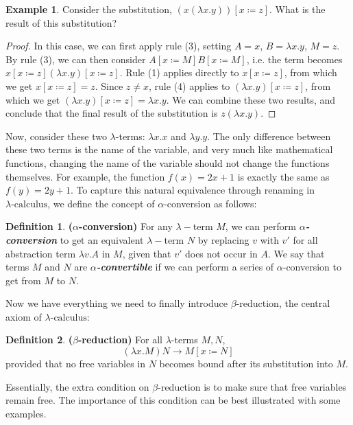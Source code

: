 \documentclass[a4paper,11pt]{article}
\theoremstyle{definition}
\newtheorem{definition}{Definition}[section]
\theoremstyle{example}
\newtheorem*{example}{Example}
\theoremstyle{lemma}
\newcommand{\lcalc}{\lambda\text{-calculus}}
\newcommand{\lamterm}[2]{\lambda #1. #2}
\newcommand{\subs}[3]{#1[#2\coloneqq#3]}
\newcommand{\redto}{\longrightarrow}
\begin{document}
\begin{example}
Consider the substitution, $\subs{(x(\lamterm{x}{y}))}{x}{z}$. What is the result of this substitution?
\end{example}
\begin{proof}
In this case, we can first apply rule (3), setting $A = x$, $B = \lamterm{x}{y}$, $M = z$. By rule (3), we can then consider $\subs{A}{x}{M}\subs{B}{x}{M}$, i.e. the term becomes $\subs{x}{x}{z}\subs{(\lamterm{x}{y})}{x}{z}$. Rule (1) applies directly to $\subs{x}{x}{z}$, from which we get $\subs{x}{x}{z} = z$. Since $z \neq x$, rule (4) applies to $\subs{(\lamterm{x}{y})}{x}{z}$, from which we get $\subs{(\lamterm{x}{y})}{x}{z} = \lamterm{x}{y}$. We can combine these two results, and conclude that the final result of the substitution is $z(\lamterm{x}{y})$.
\end{proof}

Now, consider these two $\lambda$-terms: $\lamterm{x}{x}$ and $\lamterm{y}{y}$. The only difference between these two terms is the name of the variable, and very much like mathematical functions, changing the name of the variable should not change the functions themselves. For example, the function $f(x) = 2x + 1$ is exactly the same as $f(y) = 2y + 1$. To capture this natural equivalence through renaming in $\lcalc$, we define the concept of $\alpha$-conversion as follows:

\begin{definition}
\textbf{($\alpha$-conversion)} For any $\lambda-$term $M$, we can perform \textit{\textbf{$\alpha$-conversion}} to get an equivalent $\lambda-$term $N$ by replacing $v$ with $v'$ for all abstraction term $\lamterm{v}{A}$ in $M$, given that $v'$ does not occur in $A$. We say that terms $M$ and $N$ are \textit{\textbf{$\alpha$-convertible}} if we can perform a series of $\alpha$-conversion to get from $M$ to $N$. 
\end{definition}

Now we have everything we need to finally introduce $\beta$-reduction, the central axiom of $\lcalc$:
\begin{definition}\textbf{($\beta$-reduction)}
For all $\lambda$-terms $M, N$, 
$$(\lamterm{x}{M})N \redto \subs{M}{x}{N}$$
provided that no free variables in $N$ becomes bound after its substitution into $M$.
\end{definition}

Essentially, the extra condition on $\beta$-reduction is to make sure that free variables remain free. The importance of this condition can be best illustrated with some examples.
\end{document}
